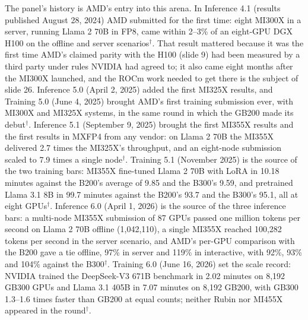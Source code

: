 \documentclass[11pt,letterpaper]{article}
\begin{document}
The panel's history is AMD's entry into this arena. In Inference 4.1 (results published August 28, 2024) AMD submitted for the first time: eight MI300X in a server, running Llama 2 70B in FP8, came within 2--3\% of an eight-GPU DGX H100 on the offline and server scenarios$^\dagger$. That result mattered because it was the first time AMD's claimed parity with the H100 (slide 9) had been measured by a third party under rules NVIDIA had agreed to; it also came eight months after the MI300X launched, and the ROCm work needed to get there is the subject of slide 26. Inference 5.0 (April 2, 2025) added the first MI325X results, and Training 5.0 (June 4, 2025) brought AMD's first training submission ever, with MI300X and MI325X systems, in the same round in which the GB200 made its debut$^\dagger$. Inference 5.1 (September 9, 2025) brought the first MI355X results and the first results in MXFP4 from any vendor: on Llama 2 70B the MI355X delivered 2.7 times the MI325X's throughput, and an eight-node submission scaled to 7.9 times a single node$^\dagger$. Training 5.1 (November 2025) is the source of the two training bars: MI355X fine-tuned Llama 2 70B with LoRA in 10.18 minutes against the B200's average of 9.85 and the B300's 9.59, and pretrained Llama 3.1 8B in 99.7 minutes against the B200's 93.7 and the B300's 95.1, all at eight GPUs$^\dagger$. Inference 6.0 (April 1, 2026) is the source of the three inference bars: a multi-node MI355X submission of 87 GPUs passed one million tokens per second on Llama 2 70B offline (1,042,110), a single MI355X reached 100,282 tokens per second in the server scenario, and AMD's per-GPU comparison with the B200 gave a tie offline, 97\% in server and 119\% in interactive, with 92\%, 93\% and 104\% against the B300$^\dagger$. Training 6.0 (June 16, 2026) set the scale record: NVIDIA trained the DeepSeek-V3 671B benchmark in 2.02 minutes on 8,192 GB300 GPUs and Llama 3.1 405B in 7.07 minutes on 8,192 GB200, with GB300 1.3--1.6 times faster than GB200 at equal counts; neither Rubin nor MI455X appeared in the round$^\dagger$.
\end{document}
